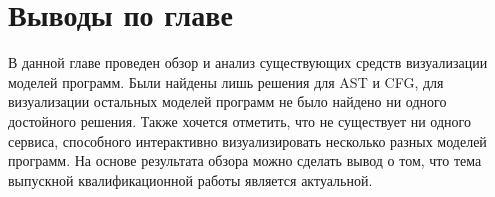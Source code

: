 \section{Выводы по главе} \label{ch2:sec2}
В данной главе проведен обзор и анализ существующих средств визуализации моделей программ. Были найдены лишь решения для AST и CFG, для визуализации остальных моделей программ не было найдено ни одного достойного решения. Также хочется отметить, что не существует ни одного сервиса, способного интерактивно визуализировать несколько разных моделей программ. На основе результата обзора можно сделать вывод о том, что тема выпускной квалификационной работы является актуальной.
\newpage
